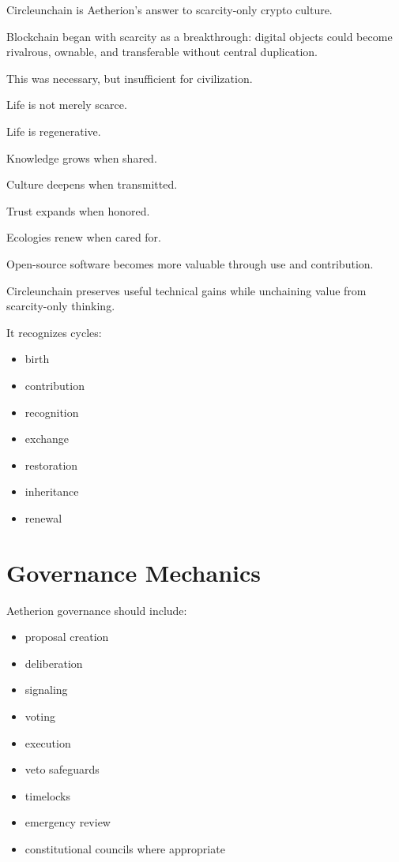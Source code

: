 ﻿\documentclass[12pt]{article}
\begin{document}
Circleunchain is Aetherion's answer to scarcity-only crypto culture.

Blockchain began with scarcity as a breakthrough: digital objects could become rivalrous, ownable, and transferable without central duplication.

This was necessary, but insufficient for civilization.

Life is not merely scarce.

Life is regenerative.

Knowledge grows when shared.

Culture deepens when transmitted.

Trust expands when honored.

Ecologies renew when cared for.

Open-source software becomes more valuable through use and contribution.

Circleunchain preserves useful technical gains while unchaining value from scarcity-only thinking.

It recognizes cycles:

\begin{itemize}
  \item birth
  \item contribution
  \item recognition
  \item exchange
  \item restoration
  \item inheritance
  \item renewal
\end{itemize}

\section{Governance Mechanics}


Aetherion governance should include:

\begin{itemize}
  \item proposal creation
  \item deliberation
  \item signaling
  \item voting
  \item execution
  \item veto safeguards
  \item timelocks
  \item emergency review
  \item constitutional councils where appropriate
\end{itemize}
\end{document}
